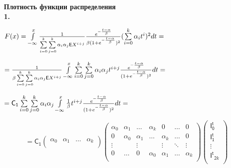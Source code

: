 \documentclass[a4paper,12pt]{article}
\begin{document}
\noindent\textbf{Плотность функции распределения}\\

\noindent\textbf{1.}

\begin{center}
$F(x) = \int\limits_{-\infty}^x {1\over{\sum\limits_{i = 0}^k}\sum\limits_{j=0}^k\alpha_i \alpha_j \mathsf{E}X^{i + j}} {e^{-{t - \alpha\over{\beta}}}\over{\beta(1 + e^{-{t - \alpha\over{\beta}}}})^2}(\sum\limits_{i = 0}^k \alpha_i t^i)^2 d t =$
\end{center}

\begin{center}
$= {1\over{\beta\sum\limits_{i = 0}^k}\sum\limits_{j=0}^k\alpha_i \alpha_j \mathsf{E}X^{i + j}} \int\limits_{-\infty}^x \sum\limits_{i = 0}^k \sum\limits_{j = 0}^k \alpha_i \alpha_j t^{i + j} {e^{-{t - \alpha\over{\beta}}}\over{(1 + e^{-{t - \alpha\over{\beta}}}})^2} d t =$
\end{center}

\begin{center}
    $= \mathsf{C_1} \sum\limits_{i = 0}^k \sum\limits_{j = 0}^k \alpha_i \alpha_j \int\limits_{-\infty}^x {1\over{\beta}} t^{i + j} {e^{-{t - \alpha\over{\beta}}}\over{(1 + e^{-{t - \alpha\over{\beta}}}})^2} d t = $
\end{center}

\begin{displaymath}
    = \mathsf{C_1} \begin{pmatrix}
        \alpha_0 & \alpha_1 & \ldots & \alpha_k \\
    \end{pmatrix} \begin{pmatrix}
        \alpha_0 & \alpha_1 & \ldots & \alpha_k & 0 & \ldots & 0 \\
        0 & \alpha_0 & \alpha_1 & \ldots & \alpha_k & \ldots & 0 \\
        \vdots &  & \vdots &  & \vdots & \ddots & \vdots\\
        0 & \ldots & 0 & \alpha_0 & \alpha_1 &\ldots & \alpha_k \\
    \end{pmatrix} \begin{pmatrix}
        \mathsf{I^t_0} \\ \mathsf{I^t_1} \\ \vdots \\ \mathsf{I^t}_{\mathsf{2}k} \\
    \end{pmatrix}
\end{displaymath}
\end{document}

